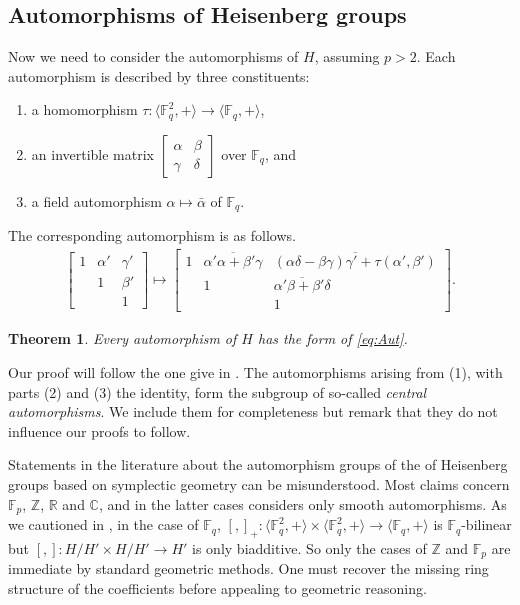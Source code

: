 \documentclass{toc}
\numberwithin{equation}{section}
\theoremstyle{plain}       %
\newtheorem{thm}[equation]{Theorem}
\theoremstyle{remark}
\theoremstyle{definition}
\numberwithin{figure}{section}
\numberwithin{table}{section}
\newcommand{\bbF}{\mathbb{F}}  %
\begin{document}
\subsection{Automorphisms of Heisenberg groups}
Now we need to consider the automorphisms of $H$, assuming $p>2$.
Each automorphism is described by three constituents:
\begin{enumerate}
\item a homomorphism $\tau:\langle \bbF_q^2,+\rangle 
\to \langle \bbF_q,+\rangle$,
\item an invertible matrix $\begin{bmatrix}\alpha & \beta\\ \gamma & \delta
\end{bmatrix}$ over $\bbF_q$, and
\item a field automorphism $\alpha\mapsto \bar{\alpha}$ of $\bbF_q$.
\end{enumerate}
The corresponding automorphism is as follows.
\begin{align}\label{eq:Aut}
	\begin{bmatrix}
		1 & \alpha' & \gamma'\\ & 1 & \beta' \\ & & 1 
	\end{bmatrix}
	\mapsto
	\begin{bmatrix}
		1 & \overline{\alpha'\alpha+\beta'\gamma} & 
		\overline{(\alpha\delta-\beta\gamma)\gamma'+\tau(\alpha',\beta')}\\ 
		& 1 & \overline{\alpha'\beta+\beta'\delta} \\ 
		& & 1 
	\end{bmatrix}.	
\end{align}
\begin{thm}\label{thm:Aut-Hei}
Every automorphism of $H$ has the form of \eqref{eq:Aut}.
\end{thm}

Our proof will follow the one give in \cite[Proposition~2.9 \& Theorem~4.1]{LW}.
The automorphisms arising from (1), with parts (2) and (3) the identity, form
the subgroup of so-called \emph{central automorphisms}.  We include them for
completeness but remark that they do not influence our proofs to follow.

\begin{remark}
Statements in the literature about the automorphism groups of the of Heisenberg
groups based on symplectic geometry can be misunderstood.  Most claims concern
$\bbF_p$, $\mathbb{Z}$, $\mathbb{R}$ and $\mathbb{C}$, and in the latter cases
considers only smooth automorphisms. As we cautioned in ,
in the case of $\bbF_q$, $[,]_+:\langle \bbF_q^2,+\rangle\times \langle
\bbF_q^2,+\rangle \to \langle \bbF_q,+\rangle$  is $\bbF_q$-bilinear but
$[,]:H/H'\times H/H'\to H'$ is only biadditive.  So only the cases of
$\mathbb{Z}$ and $\bbF_p$ are immediate by standard geometric methods.  One must
recover the missing ring structure of the coefficients before appealing to
geometric reasoning.
\end{remark}
\end{document}
